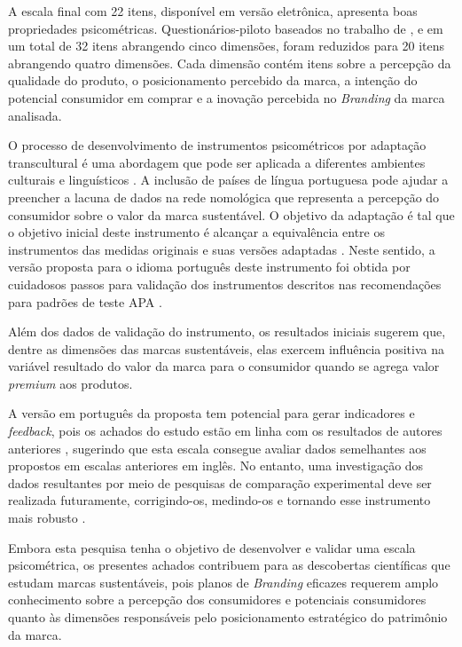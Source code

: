 A escala final com 22 itens, disponível em versão eletrônica, apresenta boas propriedades psicométricas. Questionários-piloto baseados no trabalho de  ,  e  em um total de 32 itens abrangendo cinco dimensões, foram reduzidos para 20 itens abrangendo quatro dimensões. Cada dimensão contém itens sobre a percepção da qualidade do produto, o posicionamento percebido da marca, a intenção do potencial consumidor em comprar e a inovação percebida no \textit{Branding} da marca analisada.

O processo de desenvolvimento de instrumentos psicométricos por adaptação transcultural é uma abordagem que pode ser aplicada a diferentes ambientes culturais e linguísticos \cite{Cozendey-Silva2016Cross-culturalTool}. A inclusão de países de língua portuguesa pode ajudar a preencher a lacuna de dados na rede nomológica que representa a percepção do consumidor sobre o valor da marca sustentável. O objetivo da adaptação é tal que o objetivo inicial deste instrumento é alcançar a equivalência entre os instrumentos das medidas originais e suas versões adaptadas \cite{Beaton2007RecommendationsMeasures}. Neste sentido, a versão proposta para o idioma português deste instrumento foi obtida por cuidadosos passos para validação dos instrumentos descritos nas recomendações para padrões de teste APA \cite{Association2018}.

Além dos dados de validação do instrumento, os resultados iniciais sugerem que, dentre as dimensões das marcas sustentáveis, elas exercem influência positiva na variável resultado do valor da marca para o consumidor quando se agrega valor \textit{premium} aos produtos.

A versão em português da proposta tem potencial para gerar indicadores e \textit{feedback}, pois os achados do estudo estão em linha com os resultados de autores anteriores \cite{Ng2014AntecedentsApproach,Shanti2021}, sugerindo que esta escala consegue avaliar dados semelhantes aos propostos em escalas anteriores em inglês. No entanto, uma investigação dos dados resultantes por meio de pesquisas de comparação experimental deve ser realizada futuramente, corrigindo-os, medindo-os e tornando esse instrumento mais robusto \cite{Stavropoulos2019AParents}.

Embora esta pesquisa tenha o objetivo de desenvolver e validar uma escala psicométrica, os presentes achados contribuem para as descobertas científicas que estudam marcas sustentáveis, pois planos de \textit{Branding} eficazes requerem amplo conhecimento sobre a percepção dos consumidores e potenciais consumidores quanto às dimensões responsáveis pelo posicionamento estratégico do patrimônio da marca.

